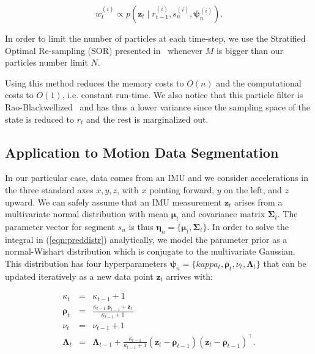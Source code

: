 \begin{equation}
\label{eqn:weight}
w_t^{(i)} \propto p(\mathbf{z}_t\mid r_{t-1}^{(i)},s_n^{(i)},
\boldsymbol{\psi}_{n}^{(i)}).
\end{equation}

In order to limit the number of particles at each time-step, we use the
Stratified Optimal Re-sampling (SOR) presented in~\cite{fearnhead07online}
whenever $M$ is bigger than our particles number limit $N$.

Using this method reduces the memory costs to $O(n)$ and the computational costs
to $O(1)$, i.e. constant run-time. We also notice that this particle filter is
Rao-Blackwellized~\cite{casella96rao} and has thus a lower variance since the
sampling space of the state is reduced to $r_t$ and the rest is marginalized out.

\subsection{Application to Motion Data Segmentation}
In our particular case, data comes from an IMU and we consider accelerations in
the three standard axes $x,y,z$, with $x$ pointing forward, $y$ on the left, and
$z$ upward. We can safely assume that an IMU measurement $\mathbf{z}_t$ arises
from a multivariate normal distribution with mean $\boldsymbol{\mu}_t$ and
covariance matrix $\boldsymbol{\Sigma}_t$. The parameter vector for segment
$s_n$ is thus
$\boldsymbol{\eta}_{n}=\{\boldsymbol{\mu}_t,\boldsymbol{\Sigma}_t\}$. In order
to solve the integral in (\ref{eqn:preddistr}) analytically, we model the
parameter prior as a normal-Wishart distribution which is conjugate to the
multivariate Gaussian. This distribution has four hyperparameters $\boldsymbol{\psi}_{n}=\{kappa_t,\boldsymbol{\rho}_t,\nu_t,\boldsymbol{\Lambda}_t\}$ that can be
updated iteratively as a new data point $\mathbf{z}_t$ arrives with:

\begin{eqnarray}
\label{eqn:hyperupdate}
\kappa_t &=& \kappa_{t-1} + 1\nonumber\\
  \boldsymbol{\rho}_t &=& \frac{\kappa_{t-1}\;\boldsymbol{\rho}_{t-1} +
\mathbf{z}_t}{\kappa_{t-1} + 1}\nonumber\\
\nu_t &=& \nu_{t-1} + 1\nonumber\\
\boldsymbol{\Lambda}_t &=& \boldsymbol{\Lambda}_{t-1} +
  \frac{\kappa_{t-1}}{\kappa_{t-1} + 1}
  (\mathbf{z}_t - \boldsymbol{\rho}_{t-1})
  (\mathbf{z}_t - \boldsymbol{\rho}_{t-1})^\intercal.
\end{eqnarray}

